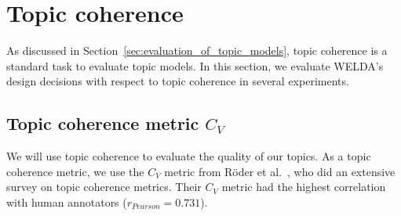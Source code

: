 \documentclass[
        a4paper,
        titlepage,
        twoside,
        parskip,
        numbers=noenddot
        ]{scrbook}
\theoremstyle{break}
\begin{document}
\section{Topic coherence}
\label{sec:topic_coherence}
As discussed in Section~\ref{sec:evaluation_of_topic_models}, topic coherence is a standard task to evaluate topic models.
In this section, we evaluate WELDA's design decisions with respect to topic coherence in several experiments.
\subsection{Topic coherence metric $C_V$}

We will use topic coherence to evaluate the quality of our topics.
As a topic coherence metric, we use the $C_V$ metric from Röder et al.~\cite{Roder2015}, who did an extensive survey on topic coherence metrics.
Their $C_V$ metric had the highest correlation with human annotators ($r_{Pearson} = 0.731$).
\end{document}
